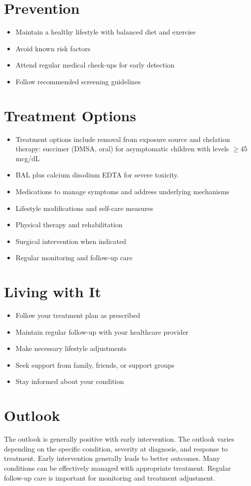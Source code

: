 \section{Prevention}
\begin{itemize}[noitemsep]
  \item Maintain a healthy lifestyle with balanced diet and exercise
  \item Avoid known risk factors
  \item Attend regular medical check-ups for early detection
  \item Follow recommended screening guidelines
\end{itemize}
\section{Treatment Options}
\begin{itemize}[noitemsep]
  \item Treatment options include removal from exposure source and chelation therapy: succimer (DMSA, oral) for asymptomatic children with levels $\ge$45 mcg/dL
  \item BAL plus calcium disodium EDTA for severe toxicity.
  \item Medications to manage symptoms and address underlying mechanisms
  \item Lifestyle modifications and self-care measures
  \item Physical therapy and rehabilitation
  \item Surgical intervention when indicated
  \item Regular monitoring and follow-up care
\end{itemize}
\section{Living with It}
\begin{itemize}[noitemsep]
  \item Follow your treatment plan as prescribed
  \item Maintain regular follow-up with your healthcare provider
  \item Make necessary lifestyle adjustments
  \item Seek support from family, friends, or support groups
  \item Stay informed about your condition
\end{itemize}
\section{Outlook}
The outlook is generally positive with early intervention. The outlook varies depending on the specific condition, severity at diagnosis, and response to treatment. Early intervention generally leads to better outcomes. Many conditions can be effectively managed with appropriate treatment. Regular follow-up care is important for monitoring and treatment adjustment.

